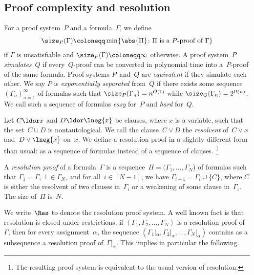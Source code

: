 \documentclass[10pt,a4paper]{article}
\begin{document}
\subsection{Proof complexity and resolution}
\label{sec:proof-complexity-and-resolution}

For a proof system~$P$ and a formula~$\Gamma$, we define
\begin{equation*}
  \size_P(\Gamma) \coloneqq \min \{\abs{\Pi}
  \colon \Pi \text{ is a $P$-proof of } \Gamma\}
\end{equation*}
if $\Gamma$ is unsatisfiable and $\size_P(\Gamma) \coloneqq \infty$ otherwise.
A proof system~$P$ \emph{simulates}~$Q$ if every~$Q$-proof
can be converted in polynomial time into a~$P$-proof of the same formula.
Proof systems $P$~and~$Q$ are \emph{equivalent} if they simulate each other.
We say $P$ is \emph{exponentially separated} from~$Q$
if there exists some sequence~$(\Gamma_n)_{n=1}^\infty$ of formulas
such that $\size_P(\Gamma_n) = n^{O(1)}$ while $\size_Q(\Gamma_n) = 2^{\Omega(n)}$.
We call such a sequence of formulas \emph{easy} for~$P$ and \emph{hard} for~$Q$.

Let $C \ldor x$ and $D \ldor \lneg{x}$ be clauses,
where $x$ is a variable, such that the set~$C \cup D$ is nontautological.
We call the clause~$C \lor D$ the \emph{resolvent}
of~$C \lor x$ and~$D \lor \lneg{x}$ on~$x$.
We define a resolution proof in a slightly different form than usual:
as a sequence of formulas instead of a sequence of clauses.%
\footnote{The resulting proof system is equivalent
  to the usual version of resolution.}

\begin{definition}
  A \emph{resolution proof} of a formula~$\Gamma$
  is a sequence~$\Pi = (\Gamma_1, \dots, \Gamma_N$) of formulas
  such that $\Gamma_1 = \Gamma$, $\bot \in \Gamma_N$,
  and for all~$i \in [N - 1]$, we have $\Gamma_{i+1} = \Gamma_i \cup \{C\}$,
  where $C$ is either the resolvent of two clauses in~$\Gamma_i$
  or a weakening of some clause in~$\Gamma_i$.
  The size of~$\Pi$ is~$N$.
\end{definition}

We write~$\Res$ to denote the resolution proof system.
A well known fact is that resolution is closed under restrictions:
if $(\Gamma_1, \Gamma_2, \dots, \Gamma_N)$ is a resolution proof of~$\Gamma$,
then for every assignment~$\alpha$,
the sequence $(\Gamma_1|_\alpha, \Gamma_2|_\alpha, \dots, \Gamma_N|_\alpha)$
contains as a subsequence a resolution proof of~$\Gamma|_\alpha$.
This implies in particular the following.
\end{document}
